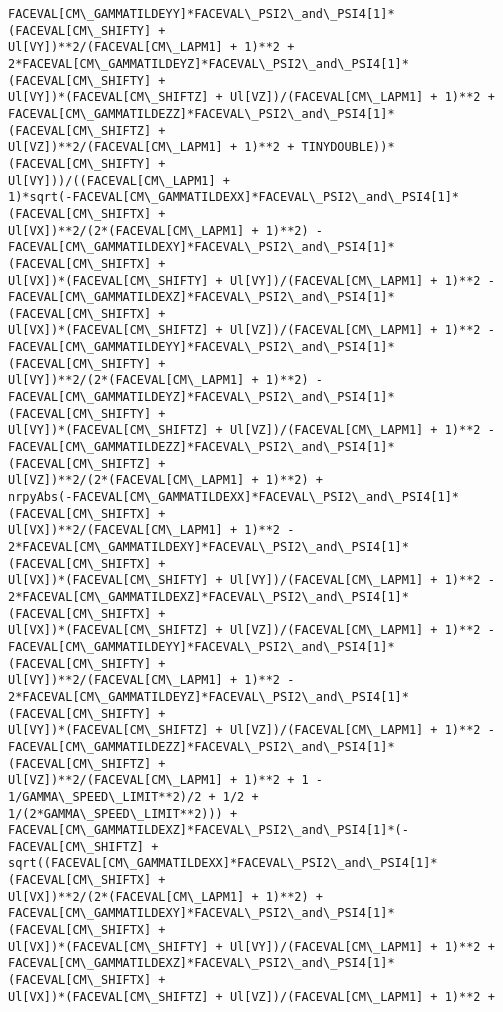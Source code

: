 \documentclass[landscape,letterpaper,10pt,english]{article}
\begin{document}
\begin{Verbatim}[commandchars=\\\{\}]
FACEVAL[CM\_GAMMATILDEYY]*FACEVAL\_PSI2\_and\_PSI4[1]*(FACEVAL[CM\_SHIFTY] +
Ul[VY])**2/(FACEVAL[CM\_LAPM1] + 1)**2 +
2*FACEVAL[CM\_GAMMATILDEYZ]*FACEVAL\_PSI2\_and\_PSI4[1]*(FACEVAL[CM\_SHIFTY] +
Ul[VY])*(FACEVAL[CM\_SHIFTZ] + Ul[VZ])/(FACEVAL[CM\_LAPM1] + 1)**2 +
FACEVAL[CM\_GAMMATILDEZZ]*FACEVAL\_PSI2\_and\_PSI4[1]*(FACEVAL[CM\_SHIFTZ] +
Ul[VZ])**2/(FACEVAL[CM\_LAPM1] + 1)**2 + TINYDOUBLE))*(FACEVAL[CM\_SHIFTY] +
Ul[VY]))/((FACEVAL[CM\_LAPM1] +
1)*sqrt(-FACEVAL[CM\_GAMMATILDEXX]*FACEVAL\_PSI2\_and\_PSI4[1]*(FACEVAL[CM\_SHIFTX] +
Ul[VX])**2/(2*(FACEVAL[CM\_LAPM1] + 1)**2) -
FACEVAL[CM\_GAMMATILDEXY]*FACEVAL\_PSI2\_and\_PSI4[1]*(FACEVAL[CM\_SHIFTX] +
Ul[VX])*(FACEVAL[CM\_SHIFTY] + Ul[VY])/(FACEVAL[CM\_LAPM1] + 1)**2 -
FACEVAL[CM\_GAMMATILDEXZ]*FACEVAL\_PSI2\_and\_PSI4[1]*(FACEVAL[CM\_SHIFTX] +
Ul[VX])*(FACEVAL[CM\_SHIFTZ] + Ul[VZ])/(FACEVAL[CM\_LAPM1] + 1)**2 -
FACEVAL[CM\_GAMMATILDEYY]*FACEVAL\_PSI2\_and\_PSI4[1]*(FACEVAL[CM\_SHIFTY] +
Ul[VY])**2/(2*(FACEVAL[CM\_LAPM1] + 1)**2) -
FACEVAL[CM\_GAMMATILDEYZ]*FACEVAL\_PSI2\_and\_PSI4[1]*(FACEVAL[CM\_SHIFTY] +
Ul[VY])*(FACEVAL[CM\_SHIFTZ] + Ul[VZ])/(FACEVAL[CM\_LAPM1] + 1)**2 -
FACEVAL[CM\_GAMMATILDEZZ]*FACEVAL\_PSI2\_and\_PSI4[1]*(FACEVAL[CM\_SHIFTZ] +
Ul[VZ])**2/(2*(FACEVAL[CM\_LAPM1] + 1)**2) +
nrpyAbs(-FACEVAL[CM\_GAMMATILDEXX]*FACEVAL\_PSI2\_and\_PSI4[1]*(FACEVAL[CM\_SHIFTX] +
Ul[VX])**2/(FACEVAL[CM\_LAPM1] + 1)**2 -
2*FACEVAL[CM\_GAMMATILDEXY]*FACEVAL\_PSI2\_and\_PSI4[1]*(FACEVAL[CM\_SHIFTX] +
Ul[VX])*(FACEVAL[CM\_SHIFTY] + Ul[VY])/(FACEVAL[CM\_LAPM1] + 1)**2 -
2*FACEVAL[CM\_GAMMATILDEXZ]*FACEVAL\_PSI2\_and\_PSI4[1]*(FACEVAL[CM\_SHIFTX] +
Ul[VX])*(FACEVAL[CM\_SHIFTZ] + Ul[VZ])/(FACEVAL[CM\_LAPM1] + 1)**2 -
FACEVAL[CM\_GAMMATILDEYY]*FACEVAL\_PSI2\_and\_PSI4[1]*(FACEVAL[CM\_SHIFTY] +
Ul[VY])**2/(FACEVAL[CM\_LAPM1] + 1)**2 -
2*FACEVAL[CM\_GAMMATILDEYZ]*FACEVAL\_PSI2\_and\_PSI4[1]*(FACEVAL[CM\_SHIFTY] +
Ul[VY])*(FACEVAL[CM\_SHIFTZ] + Ul[VZ])/(FACEVAL[CM\_LAPM1] + 1)**2 -
FACEVAL[CM\_GAMMATILDEZZ]*FACEVAL\_PSI2\_and\_PSI4[1]*(FACEVAL[CM\_SHIFTZ] +
Ul[VZ])**2/(FACEVAL[CM\_LAPM1] + 1)**2 + 1 - 1/GAMMA\_SPEED\_LIMIT**2)/2 + 1/2 +
1/(2*GAMMA\_SPEED\_LIMIT**2))) +
FACEVAL[CM\_GAMMATILDEXZ]*FACEVAL\_PSI2\_and\_PSI4[1]*(-FACEVAL[CM\_SHIFTZ] +
sqrt((FACEVAL[CM\_GAMMATILDEXX]*FACEVAL\_PSI2\_and\_PSI4[1]*(FACEVAL[CM\_SHIFTX] +
Ul[VX])**2/(2*(FACEVAL[CM\_LAPM1] + 1)**2) +
FACEVAL[CM\_GAMMATILDEXY]*FACEVAL\_PSI2\_and\_PSI4[1]*(FACEVAL[CM\_SHIFTX] +
Ul[VX])*(FACEVAL[CM\_SHIFTY] + Ul[VY])/(FACEVAL[CM\_LAPM1] + 1)**2 +
FACEVAL[CM\_GAMMATILDEXZ]*FACEVAL\_PSI2\_and\_PSI4[1]*(FACEVAL[CM\_SHIFTX] +
Ul[VX])*(FACEVAL[CM\_SHIFTZ] + Ul[VZ])/(FACEVAL[CM\_LAPM1] + 1)**2 +

\end{Verbatim}
\end{document}
